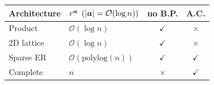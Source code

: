 \setlength{\tabcolsep}{3pt}
\caption{Summary of the main result. We consider four architectures for the IQP circuit (\cref{pic:illustration}), and report the scaling of the critical rank $r^\vta$ (\cref{thm:uniform}) -- the key property of the circuit determining the scaling of MMD's derivative. ``no B.P.'' indicates the absence of barren plateau in the MMD loss. ``A.C.'' means $L^2$ anti-concentration (\cref{def:anti-concentration}) of the IQP-QCBM's output distribution, needed to claim classical non-simulability.}
\vspace{0.5cm}
\label{tab:examples-summary}
\begin{tabular}{llcc}
\toprule
Architecture 
& $r^\vta$ $(|{\bm{a}}|=\mathcal{O}(\log n))$ 
& no B.P. 
& A.C. \\
\midrule
Product
& $\mathcal{O}(\log n)$
& $\checkmark$
& $\times$ \\

2D lattice
& $\mathcal{O}(\log n)$
& $\checkmark$
& $\times$ \\

Sparse ER
& $\mathcal{O}(\mathrm{polylog}(n))$
& $\checkmark$
& $\checkmark$ \\

Complete
& $n$
& $\times$
& $\checkmark$ \\
\bottomrule
\end{tabular}